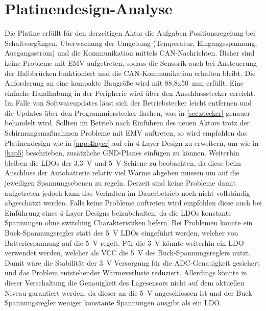 \section{Platinendesign-Analyse}\label{sec:platan}
Die Platine erfüllt für den derzeitigen Aktor die Aufgaben Positionsregelung bei Schaltvorgängen, Überwachung der Umgebung (Temperatur, Eingangsspannung, Ausgangsstrom) und die Kommunikation mittels CAN-Nachrichten. Bisher sind keine Probleme mit EMV aufgetreten, sodass die Sensorik auch bei Ansteuerung der Halbbrücken funktioniert und die CAN-Kommunikation erhalten bleibt. Die Anforderung an eine kompakte Baugröße wird mit 88,8x\SI{50}{mm} erfüllt. Eine einfache Handhabung in der Peripherie wird über den Anschlussstecker erreicht. Im Falle von Softwareupdates lässt sich der Betriebstecker leicht entfernen und die Updates über den Programmierstecker flashen, was in \autoref{sec:stecker} genauer behandelt wird. Sollten im Betrieb nach Einführen des neuen Aktors trotz der Schirmungsmaßnahmen Probleme mit EMV auftreten, so wird empfohlen das Platinendesign wie in \autoref{app:4layer} auf ein 4-Layer Design zu erweitern, um wie in \autoref{kap5} beschrieben, zusätzliche GND-Planes einfügen zu können. Weiterhin bleiben die LDOs der \SI{3,3}{V} und \SI{5}{V} Schiene zu beobachten, da diese beim Anschluss der Autobatterie relativ viel Wärme abgeben müssen um auf die jeweiligen Spannungsebenen zu regeln. Derzeit sind keine Probleme damit aufgetreten jedoch kann das Verhalten im Dauerbetrieb noch nicht vollständig abgeschätzt werden. Falls keine Probleme auftreten wird empfohlen diese auch bei Einführung eines 4-Layer Designs beizubehalten, da die LDOs konstante Spannungen ohne switching Charakteristiken liefern. Bei Problemen könnte ein Buck-Spannungsregler statt des \SI{5}{V} LDOs eingeführt werden, welcher von Batteriespannung auf die \SI{5}{V} regelt. Für die \SI{3}{V} könnte weiterhin ein LDO verwendet werden, welcher als VCC die \SI{5}{V} des Buck-Spannungsreglers nutzt. Damit wäre die Stabilität der \SI{3}{V} Versorgung für die ADC-Genauigkeit gesichert und das Problem entstehender Wärmeverluste reduziert. Allerdings könnte in dieser Verschaltung die Genauigkeit des Lagesensors nicht auf dem aktuellen Niveau garantiert werden, da dieser an die \SI{5}{V} angeschlossen ist und der Buck-Spannungsregler weniger konstante Spannungen ausgibt als ein LDO. 

